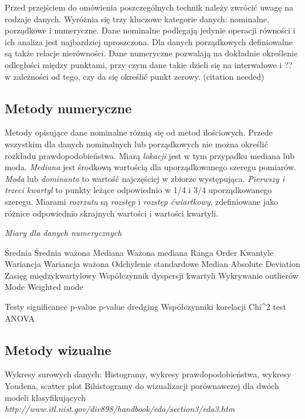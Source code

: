 \documentclass[12pt,a4paper,oneside]{report} %
\begin{document}
Przed przejściem do omówienia poszczególnych technik należy zwrócić uwagę na rodzaje danych. Wyróżnia się trzy kluczowe kategorie danych: nominalne, porządkowe i numeryczne. Dane nominalne podlegają jedynie operacji równości i ich analiza jest najbardziej uproszczona. Dla danych porządkowych definiowalne są także relacje nierówności. Dane numeryczne pozwalają na dokładnie określenie odległości między punktami, przy czym dane takie dzieli się na interwałowe i ?? w zależności od tego, czy da się określić punkt zerowy. (citation needed)\par

\subsection{Metody numeryczne}

Metody opisujące dane nominalne różnią się od metod ilościowych. Przede wszystkim dla danych nominalnych lub porządkowych nie można określić rozkładu prawdopodobieństwa. Miarą \emph{lokacji} jest w tym przypadku mediana lub moda. \emph{Mediana} jest środkową wartością dla uporządkowanego szeregu pomiarów. \emph{Moda} lub \emph{dominanta} to wartość najczęściej w zbiorze występująca. \emph{Pierwszy i trzeci kwartyl} to punkty leżące odpowiednio w 1/4 i 3/4 uporządkowanego szeregu. Miarami \emph{rozrzutu} są \emph{rozstęp} i \emph{rozstęp ćwiartkowy}, zdefiniowane jako różnice odpowiednio skrajnych wartości i wartości kwartyli. \par

\emph{Miary dla danych numerycznych}\par

Średnia
Średnia ważona
Mediana
Ważona mediana
Ranga
Order
Kwantyle
Wariancja
Wariancja ważona
Odchylenie standardowe
Median Absolute Deviation
Zasięg międzykwartylowy
Współczynnik dyspersji kwartyli
Wykrywanie outlierów
Mode
Weighted mode







Testy significance
p-value
p-value dredging
Współczynniki korelacji
Chi^2 test
ANOVA

\subsection{Metody wizualne}

Wykresy surowych danych:
Histogramy, wykresy prawdopodobieństwa, wykresy Youdena, scatter plot
Bihistogramy do wizualizacji porównawczej dla dwóch modeli klasyfikujących
\emph{http://www.itl.nist.gov/div898/handbook/eda/section3/eda3.htm}
\end{document}
